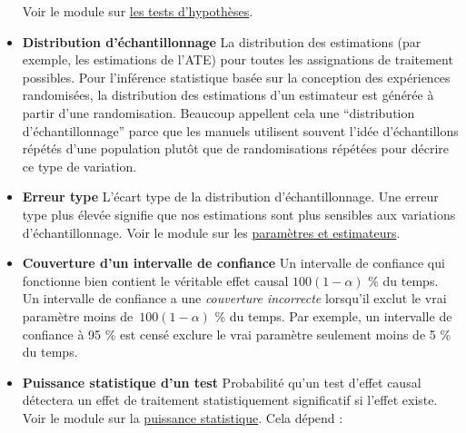 \documentclass[12pt,]{book}
\begin{document}
\begin{itemize}
  Voir le module sur \href{tests-dhypothèses.html}{les tests d'hypothèses}.
\item
  \textbf{Distribution d'échantillonnage} La distribution des estimations (par exemple, les estimations de l'ATE) pour toutes les assignations de traitement possibles.
  Pour l'inférence statistique basée sur la conception des expériences randomisées, la distribution des estimations d'un estimateur est générée à partir d'une randomisation.
  Beaucoup appellent cela une ``distribution d'échantillonnage'' parce que les manuels utilisent souvent l'idée d'échantillons répétés d'une population plutôt que de randomisations répétées pour décrire ce type de variation.
\item
  \textbf{Erreur type} L'écart type de la distribution d'échantillonnage. Une erreur type plus élevée signifie que nos estimations sont plus sensibles aux variations d'échantillonnage.
  Voir le module sur les \href{paramètres-et-estimateurs.html}{paramètres et estimateurs}.
\item
  \textbf{Couverture d'un intervalle de confiance} Un intervalle de confiance qui fonctionne bien contient le véritable effet causal \(100 ( 1 - \alpha)\) \% du temps.
  Un intervalle de confiance a une \emph{couverture incorrecte} lorsqu'il exclut le vrai paramètre moins de~\(100 (1 - \alpha)\) \% du temps.
  Par exemple, un intervalle de confiance à 95 \% est censé exclure le vrai paramètre seulement moins de 5 \% du temps.
\item
  \textbf{Puissance statistique d'un test} Probabilité qu'un test d'effet causal détectera un effet de traitement statistiquement significatif si l'effet existe.
  Voir le module sur la \href{puissance-statistique-et-diagnostics-de-conception.html}{puissance statistique}.
  Cela dépend :


\end{itemize}
\end{document}
